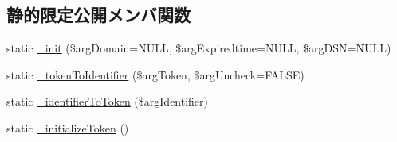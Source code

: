 \subsection*{静的限定公開メンバ関数}
\begin{DoxyCompactItemize}
\item 
static \hyperlink{class_session_d_b_ad06b74e267ec7f1e1e64a09cf1ce430e}{\+\_\+init} (\$arg\+Domain=N\+U\+L\+L, \$arg\+Expiredtime=N\+U\+L\+L, \$arg\+D\+S\+N=N\+U\+L\+L)
\item 
static \hyperlink{class_session_d_b_afc4ea0089bf659a952a500d8a0106d82}{\+\_\+token\+To\+Identifier} (\$arg\+Token, \$arg\+Uncheck=F\+A\+L\+S\+E)
\item 
static \hyperlink{class_session_d_b_ad31baeaf0488fd9f7d7cecb6ac10bfcc}{\+\_\+identifier\+To\+Token} (\$arg\+Identifier)
\item 
static \hyperlink{class_session_d_b_a08b430e3942c1275034ebcc8f74478b2}{\+\_\+initialize\+Token} ()
\end{DoxyCompactItemize}
